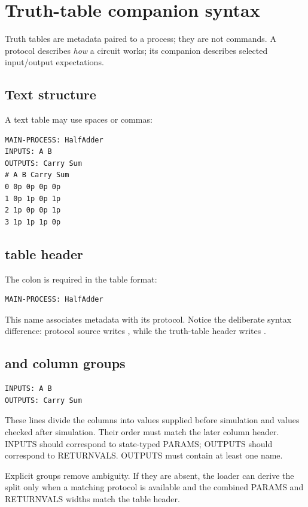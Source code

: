 \section{Truth-table companion syntax}

Truth tables are metadata paired to a process; they are not 
commands. A protocol describes \emph{how} a circuit works; its companion
 describes selected input/output expectations.

\subsection{Text  structure}

A text table may use spaces or commas:

\begin{lstlisting}
MAIN-PROCESS: HalfAdder
INPUTS: A B
OUTPUTS: Carry Sum
# A B Carry Sum
0 0p 0p 0p 0p
1 0p 1p 0p 1p
2 1p 0p 0p 1p
3 1p 1p 1p 0p
\end{lstlisting}

\subsection{ table header}

The colon is required in the table format:
\begin{lstlisting}
MAIN-PROCESS: HalfAdder
\end{lstlisting}
This name associates metadata with its protocol. Notice the deliberate syntax
difference: protocol source writes , while the
truth-table header writes .

\subsection{ and  column groups}

\begin{lstlisting}
INPUTS: A B
OUTPUTS: Carry Sum
\end{lstlisting}
These lines divide the columns into values supplied before simulation and
values checked after simulation. Their order must match the later column header.
INPUTS should correspond to state-typed PARAMS; OUTPUTS should correspond to
RETURNVALS. OUTPUTS must contain at least one name.

Explicit groups remove ambiguity. If they are absent, the loader can derive the
split only when a matching protocol is available and the combined PARAMS and
RETURNVALS widths match the table header.

